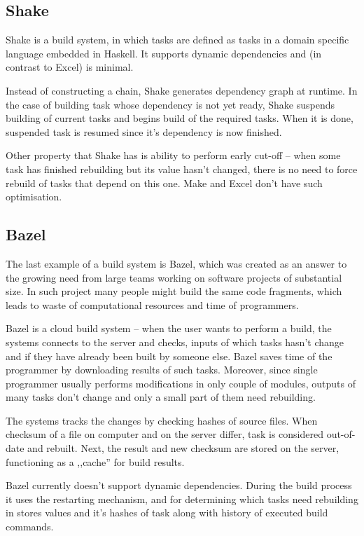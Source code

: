 \subsection{Shake}

Shake is a build system, in which tasks are defined as tasks in a domain specific language embedded in Haskell. It supports dynamic dependencies and (in contrast to Excel) is minimal.

Instead of constructing a chain, Shake generates dependency graph at runtime. In the case of building task whose dependency is not yet ready, Shake suspends building of current tasks and begins build of the required tasks. When it is done, suspended task is resumed since it's dependency is now finished.

Other property that Shake has is ability to perform early cut-off -- when some task has finished rebuilding but its value hasn't changed, there is no need to force rebuild of tasks that depend on this one. Make and Excel don't have such optimisation.

\subsection{Bazel}

The last example of a build system is Bazel, which was created as an answer to the growing need from large teams working on software projects of substantial size. In such project many people might build the same code fragments, which leads to waste of computational resources and time of programmers.

Bazel is a cloud build system -- when the user wants to perform a build, the systems connects to the server and checks, inputs of which tasks hasn't change and if they have already been built by someone else. Bazel saves time of the programmer by downloading results of such tasks. Moreover, since single programmer usually performs modifications in only couple of modules, outputs of many tasks don't change and only a small part of them need rebuilding.

The systems tracks the changes by checking hashes of source files. When checksum of a file on computer and on the server differ, task is considered out-of-date and rebuilt. Next, the result and new checksum are stored on the server, functioning as a ,,cache'' for build results.

Bazel currently doesn't support dynamic dependencies. During the build process it uses the restarting mechanism, and for determining which tasks need rebuilding in stores values and it's hashes of task along with history of executed build commands.

